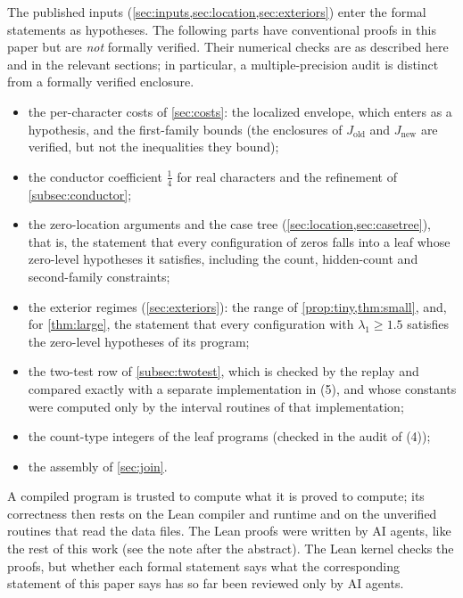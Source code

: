 \documentclass[11pt]{amsart}
\numberwithin{equation}{section}
\theoremstyle{plain}
\theoremstyle{definition}
\theoremstyle{remark}
\newcommand{\1}{\mathbf{1}}
\begin{document}
The published inputs (\cref{sec:inputs,sec:location,sec:exteriors}) enter the formal
statements as hypotheses. The following parts have conventional proofs in this paper
but are \emph{not} formally verified. Their numerical checks are as described here and
in the relevant sections; in particular, a multiple-precision audit is distinct from
a formally verified enclosure.
\begin{itemize}
  \item the per-character costs of \cref{sec:costs}: the localized envelope, which enters as a
    hypothesis, and the first-family bounds (the enclosures of $J_{\mathrm{old}}$ and $J_{\mathrm{new}}$
    are verified, but not the inequalities they bound);
  \item the conductor coefficient $\frac14$ for real characters and the refinement of
    \cref{subsec:conductor};
  \item the zero-location arguments and the case tree (\cref{sec:location,sec:casetree}), that is, the
    statement that every configuration of zeros falls into a leaf whose zero-level hypotheses it
    satisfies, including the count, hidden-count and second-family constraints;
  \item the exterior regimes (\cref{sec:exteriors}): the range of \cref{prop:tiny,thm:small}, and,
    for \cref{thm:large}, the statement that every configuration with $\lambda_1\ge1.5$ satisfies the
    zero-level hypotheses of its program;
  \item the two-test row of \cref{subsec:twotest}, which is checked by the replay and compared
    exactly with a separate implementation in (5), and whose constants were computed only by the
    interval routines of that implementation;
  \item the count-type integers of the leaf programs (checked in the audit of (4));
  \item the assembly of \cref{sec:join}.
\end{itemize}
A compiled program is trusted to compute what it is proved to compute; its correctness then rests
on the Lean compiler and runtime and on the unverified routines that read the data files. The Lean
proofs were written by AI agents, like the rest of this work (see the note after the abstract).
The Lean kernel checks the proofs, but whether each formal statement says what the corresponding
statement of this paper says has so far been reviewed only by AI agents.
\end{document}
